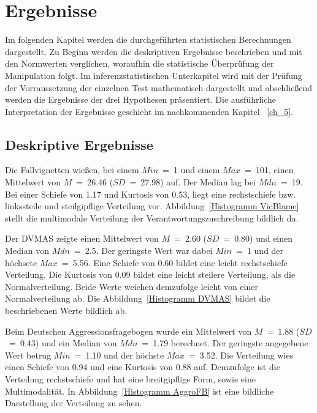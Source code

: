 \chapter{Ergebnisse}   \label{ch_4}
Im folgenden Kapitel werden die durchgeführten statistischen Berechnungen dargestellt. Zu Beginn werden die deskriptiven Ergebnisse beschrieben und mit den Normwerten verglichen, woraufhin die statistische Überprüfung der Manipulation folgt. Im inferenzstatistischen Unterkapitel wird mit der Prüfung der Vorraussetzung der einzelnen Test mathematisch dargestellt und abschließend werden die Ergebnisse der drei Hypothesen präsentiert. Die ausführliche Interpretation der Ergebnisse geschieht im nachkommenden Kapitel ~\ref{ch_5}.

\section{Deskriptive Ergebnisse}    \label{sec_4.1}
Die Fallvignetten wießen, bei einem $Min$~=~1 und einem $Max$~=~101, einen Mittelwert von $M$~=~26.46 ($SD$~=~27.98) auf. Der Median lag bei $Mdn$~=~19. Bei einer Schiefe von 1.17 und Kurtosis von 0.53, liegt eine rechstschiefe bzw. linkssteile und steilgipflige Verteilung vor. Abbildung~\ref{Histogramm VicBlame} stellt die multimodale Verteilung der Verantwortungszuschreibung bildlich da. %


Der DVMAS zeigte einen Mittelwert von $M$~=~2.60 ($SD$~=~0.80) und einen Median von $Mdn$~=~2.5. Der geringste Wert war dabei $Min$~=~1 und der höchsete $Max$~=~5.56. Eine Schiefe von 0.60 bildet eine leicht rechstschiefe Verteilung. Die Kurtosis von 0.09 bildet eine leicht steilere Verteilung, als die Normalverteilung. Beide Werte weichen demzufolge leicht von einer Normalverteilung ab. Die Abbildung~\ref{Histogramm DVMAS} bildet die beschriebenen Werte bildlich ab. %


Beim Deutschen Aggressionsfragebogen wurde ein Mittelwert von $M$~=~1.88 ($SD$~=~0.43) und ein Median von $Mdn$~=~1.79 berechnet. Der geringste angegebene Wert betrug $Min$~=~1.10 und der höchste $Max$~=~3.52. Die Verteilung wies einen Schiefe von 0.94 und eine Kurtosis von 0.88 auf. Demzufolge ist die Verteilung rechstschiefe und hat eine breitgipflige Form, sowie eine Multimodalität. In Abbildung~\ref{Histogramm AggroFB} ist eine bildliche Darstellung der Verteilung zu sehen.



